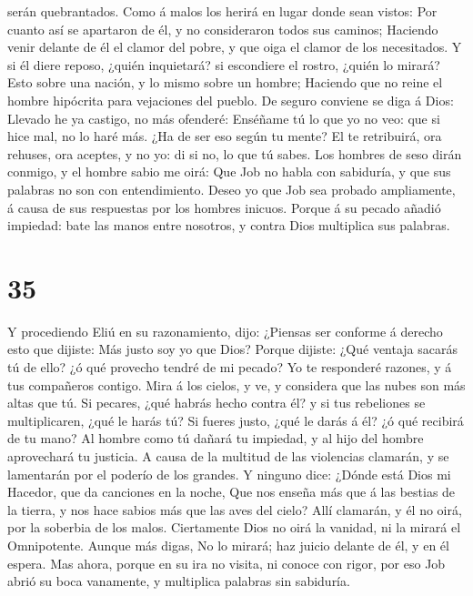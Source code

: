 serán quebrantados.  Como á malos los herirá en lugar
donde sean vistos:  Por cuanto así se apartaron de él, y
no consideraron todos sus caminos;  Haciendo venir
delante de él el clamor del pobre, y que oiga el clamor de los
necesitados.  Y si él diere reposo, ¿quién inquietará? si
escondiere el rostro, ¿quién lo mirará? Esto sobre una nación, y lo
mismo sobre un hombre;  Haciendo que no reine el hombre
hipócrita para vejaciones del pueblo.  De seguro conviene
se diga á Dios: Llevado he ya castigo, no más ofenderé: 
Enséñame tú lo que yo no veo: que si hice mal, no lo haré más.
 ¿Ha de ser eso según tu mente? El te retribuirá, ora
rehuses, ora aceptes, y no yo: di si no, lo que tú sabes.
 Los hombres de seso dirán conmigo, y el hombre sabio me
oirá:  Que Job no habla con sabiduría, y que sus palabras
no son con entendimiento.  Deseo yo que Job sea probado
ampliamente, á causa de sus respuestas por los hombres inicuos.
 Porque á su pecado añadió impiedad: bate las manos entre
nosotros, y contra Dios multiplica sus palabras.

\hypertarget{section-34}{%
\section{35}\label{section-34}}

 Y procediendo Eliú en su razonamiento, dijo:
 ¿Piensas ser conforme á derecho esto que dijiste: Más
justo soy yo que Dios?  Porque dijiste: ¿Qué ventaja
sacarás tú de ello? ¿ó qué provecho tendré de mi pecado? 
Yo te responderé razones, y á tus compañeros contigo. 
Mira á los cielos, y ve, y considera que las nubes son más altas que tú.
 Si pecares, ¿qué habrás hecho contra él? y si tus
rebeliones se multiplicaren, ¿qué le harás tú?  Si fueres
justo, ¿qué le darás á él? ¿ó qué recibirá de tu mano?  Al
hombre como tú dañará tu impiedad, y al hijo del hombre aprovechará tu
justicia.  A causa de la multitud de las violencias
clamarán, y se lamentarán por el poderío de los grandes. 
Y ninguno dice: ¿Dónde está Dios mi Hacedor, que da canciones en la
noche,  Que nos enseña más que á las bestias de la
tierra, y nos hace sabios más que las aves del cielo? 
Allí clamarán, y él no oirá, por la soberbia de los malos.
 Ciertamente Dios no oirá la vanidad, ni la mirará el
Omnipotente.  Aunque más digas, No lo mirará; haz juicio
delante de él, y en él espera.  Mas ahora, porque en su
ira no visita, ni conoce con rigor, por eso Job abrió su boca vanamente,
y multiplica palabras sin sabiduría. 

